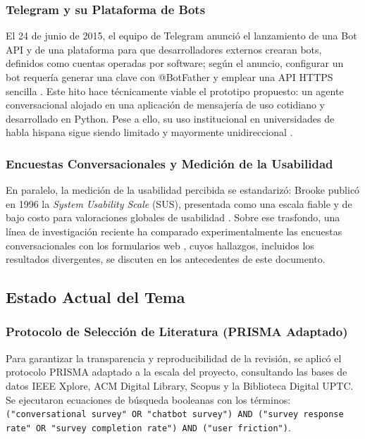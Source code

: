\documentclass[12pt,letterpaper]{article}
\begin{document}
\subsubsection{Telegram y su Plataforma de Bots}
 
El 24 de junio de 2015, el equipo de Telegram anunció el lanzamiento de una Bot API y de una plataforma para que desarrolladores externos crearan bots, definidos como cuentas operadas por software; según el anuncio, configurar un bot requería generar una clave con @BotFather y emplear una API HTTPS sencilla \cite{telegram2015}. Este hito hace técnicamente viable el prototipo propuesto: un agente conversacional alojado en una aplicación de mensajería de uso cotidiano y desarrollado en Python. Pese a ello, su uso institucional en universidades de habla hispana sigue siendo limitado y mayormente unidireccional \cite{cisternas2022}.
 
\subsubsection{Encuestas Conversacionales y Medición de la Usabilidad}
 
En paralelo, la medición de la usabilidad percibida se estandarizó: Brooke publicó en 1996 la \textit{System Usability Scale} (SUS), presentada como una escala fiable y de bajo costo para valoraciones globales de usabilidad \cite{brooke1996}. Sobre ese trasfondo, una línea de investigación reciente ha comparado experimentalmente las encuestas conversacionales con los formularios web \cite{kim2019, xiao2020, beam2023, zarouali2023, devecifuchs2026}, cuyos hallazgos, incluidos los resultados divergentes, se discuten en los antecedentes de este documento.


\subsection{Estado Actual del Tema}
 
\subsubsection{Protocolo de Selección de Literatura (PRISMA Adaptado)}
Para garantizar la transparencia y reproducibilidad de la revisión, se aplicó el protocolo PRISMA adaptado a la escala del proyecto, consultando las bases de datos IEEE Xplore, ACM Digital Library, Scopus y la Biblioteca Digital UPTC. Se ejecutaron ecuaciones de búsqueda booleanas con los términos: \texttt{("conversational survey" OR "chatbot survey") AND ("survey response rate" OR "survey completion rate") AND ("user friction")}.
 
\end{document}
